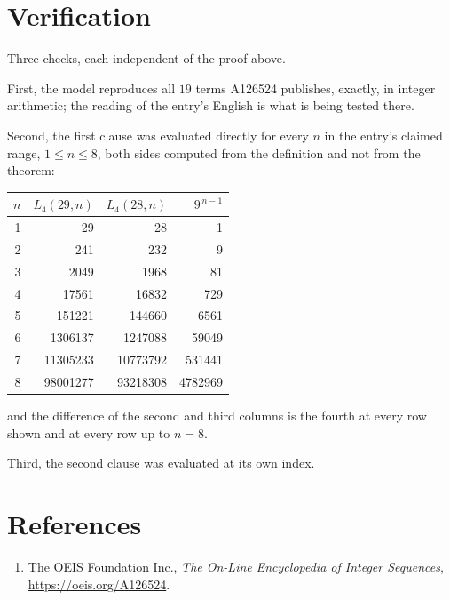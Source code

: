 \documentclass[11pt,a4paper]{article}
\theoremstyle{plain}
\theoremstyle{definition}
\begin{document}
\section{Verification}

Three checks, each independent of the proof above.

First, the model reproduces all $19$ terms A126524 publishes, exactly, in integer
arithmetic; the reading of the entry's English is what is being tested there.

Second, the first clause was evaluated directly for every $n$ in the entry's claimed range,
$1\le n\le8$, both sides computed from the definition and not from the theorem:

\begin{center}
\begin{tabular}{rrrr}
$n$ & $L_{4}(29,n)$ & $L_{4}(28,n)$ & $9^{\,n-1}$ \\ \hline
1 & 29 & 28 & 1 \\
2 & 241 & 232 & 9 \\
3 & 2049 & 1968 & 81 \\
4 & 17561 & 16832 & 729 \\
5 & 151221 & 144660 & 6561 \\
6 & 1306137 & 1247088 & 59049 \\
7 & 11305233 & 10773792 & 531441 \\
8 & 98001277 & 93218308 & 4782969 \\
\end{tabular}
\end{center}

\noindent and the difference of the second and third columns is the fourth at every row shown
and at every row up to $n=8$.

Third, the second clause was evaluated at its own index.

\section*{References}
\begin{enumerate}
\item The OEIS Foundation Inc., \emph{The On-Line Encyclopedia of Integer Sequences},
\url{https://oeis.org/A126524}.
\end{enumerate}
\end{document}
